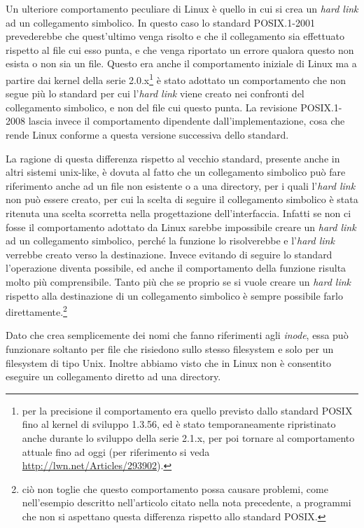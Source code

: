 Un ulteriore comportamento peculiare di Linux è quello in cui si crea un
\textit{hard link} ad un collegamento simbolico. In questo caso lo standard
POSIX.1-2001 prevederebbe che quest'ultimo venga risolto e che il collegamento
sia effettuato rispetto al file cui esso punta, e che venga riportato un
errore qualora questo non esista o non sia un file. Questo era anche il
comportamento iniziale di Linux ma a partire dai kernel della serie
2.0.x\footnote{per la precisione il comportamento era quello previsto dallo
  standard POSIX fino al kernel di sviluppo 1.3.56, ed è stato temporaneamente
  ripristinato anche durante lo sviluppo della serie 2.1.x, per poi tornare al
  comportamento attuale fino ad oggi (per riferimento si veda
  \url{http://lwn.net/Articles/293902}).} è stato adottato un comportamento
che non segue più lo standard per cui l'\textit{hard link} viene creato nei
confronti del collegamento simbolico, e non del file cui questo punta. La
revisione POSIX.1-2008 lascia invece il comportamento dipendente
dall'implementazione, cosa che rende Linux conforme a questa versione
successiva dello standard.


La ragione di questa differenza rispetto al vecchio standard, presente anche
in altri sistemi unix-like, è dovuta al fatto che un collegamento simbolico
può fare riferimento anche ad un file non esistente o a una directory, per i
quali l'\textit{hard link} non può essere creato, per cui la scelta di seguire
il collegamento simbolico è stata ritenuta una scelta scorretta nella
progettazione dell'interfaccia.  Infatti se non ci fosse il comportamento
adottato da Linux sarebbe impossibile creare un \textit{hard link} ad un
collegamento simbolico, perché la funzione lo risolverebbe e l'\textit{hard
  link} verrebbe creato verso la destinazione. Invece evitando di seguire lo
standard l'operazione diventa possibile, ed anche il comportamento della
funzione risulta molto più comprensibile. Tanto più che se proprio se si vuole
creare un \textit{hard link} rispetto alla destinazione di un collegamento
simbolico è sempre possibile farlo direttamente.\footnote{ciò non toglie che
  questo comportamento possa causare problemi, come nell'esempio descritto
  nell'articolo citato nella nota precedente, a programmi che non si aspettano
  questa differenza rispetto allo standard POSIX.}

Dato che  crea semplicemente dei nomi che fanno riferimenti agli
\textit{inode}, essa può funzionare soltanto per file che risiedono sullo
stesso filesystem e solo per un filesystem di tipo Unix.  Inoltre abbiamo
visto che in Linux non è consentito eseguire un collegamento diretto ad una
directory.

